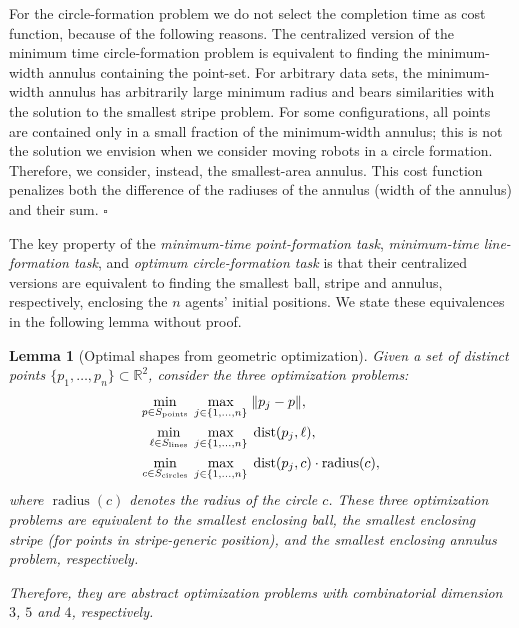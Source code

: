 \documentclass[onecolumn,journal,letterpaper]{IEEEtran}
\newcommand{\real}{{\mathbb{R}}}
\newcommand{\subscr}[2]{{#1}_{\textup{#2}}}
\newcommand{\norm}[1]{\|#1\|}
\newcommand{\radius}{\operatorname{radius}}
\newcommand{\until}[1]{\{1,\dots,#1\}}
\newcommand{\dist}{\operatorname{dist}}
\newtheorem{lemma}[theorem]{Lemma}
{\theorembodyfont{\rmfamily} \newtheorem{conjecture}[theorem]{Conjecture}
\newtheorem{remark}[theorem]{Remark}
\newtheorem{remarks}[theorem]{Remarks}
\newtheorem{example}[theorem]{Example}
\newtheorem{algo}[theorem]{Algorithm}
\newtheorem{problem}[theorem]{Problem}}
\newcommand\oprocendsymbol{\hbox{$\square$}}
\newcommand\oprocend{\relax\ifmmode\else\unskip\hfill\fi\oprocendsymbol}
\begin{document}
\begin{remark} For the circle-formation problem we do not
  select the completion time as cost function, because of the following
  reasons. The centralized version of the minimum time circle-formation
  problem is equivalent to finding the minimum-width annulus containing the
  point-set. For arbitrary data sets, the minimum-width annulus has
  arbitrarily large minimum radius and bears similarities with the solution
  to the smallest stripe problem.  For some configurations, all points are
  contained only in a small fraction of the minimum-width annulus; this is
  not the solution we envision when we consider moving robots in a circle
  formation.  Therefore, we consider, instead, the smallest-area
  annulus. This cost function penalizes both the difference of the radiuses
  of the annulus (width of the annulus) and their sum.  \oprocend
\end{remark}


The key property of the \emph{minimum-time point-formation task},
\emph{minimum-time line-formation task}, and \emph{optimum circle-formation
  task} is that their centralized versions are equivalent to finding the
smallest ball, stripe and annulus, respectively, enclosing the $n$ agents'
initial positions. We state these equivalences in the following lemma
without proof.

\begin{lemma}[Optimal shapes from geometric optimization]
  Given a set of distinct points $\{p_1,\dots,p_n\} \subset \real^2$,
  consider the three optimization problems:
  \begin{equation*}
  \begin{split}
    \min_{p\in\subscr{S}{points}} \; \max_{j\in\until{n}} & \; \norm{p_j - p}{},\\
    \min_{\ell\in\subscr{S}{lines}}\; \max_{j\in\until{n}} &\; \dist(p_j, \ell), \\
    \min_{c\in\subscr{S}{circles}} \; \max_{j\in\until{n}} &\; \dist(p_j, c) \cdot
    \radius(c),
  \end{split}
  \end{equation*}
  where $\radius(c)$ denotes the radius of the circle $c$.  These three
  optimization problems are equivalent to the smallest enclosing ball, the
  smallest enclosing stripe (for points in stripe-generic position), and
  the smallest enclosing annulus problem, respectively.

  Therefore, they are abstract optimization problems with combinatorial
  dimension $3$, $5$ and $4$, respectively.
\end{lemma}
\end{document}
